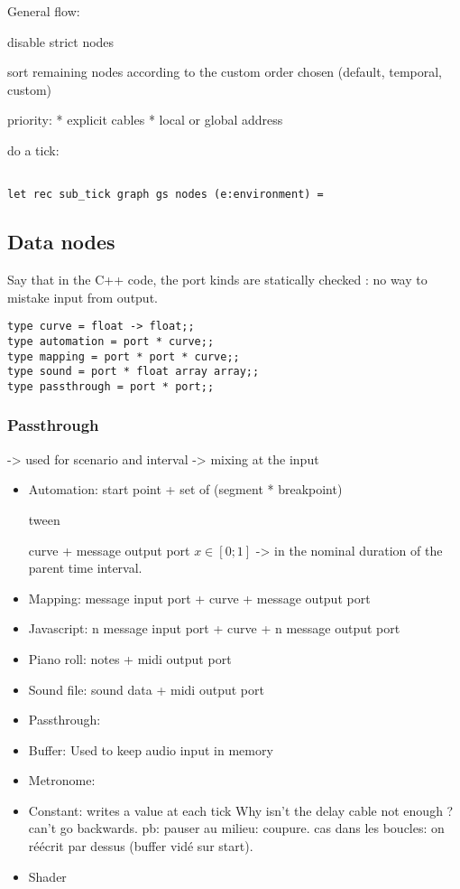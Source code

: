 \documentclass[applsci,article,submit,moreauthors,pdftex,10pt,a4paper]{mdpi}
\begin{document}
General flow: 

disable strict nodes

sort remaining nodes according to the custom order chosen (default, temporal, custom)

priority: 
* explicit cables
* local or global address

do a tick: 

\begin{lstlisting}

let rec sub_tick graph gs nodes (e:environment) =
\end{lstlisting}


\subsection{Data nodes}
Say that in the C++ code, the port kinds are statically checked : no way to mistake input from output.
\begin{lstlisting}
type curve = float -> float;;
type automation = port * curve;;
type mapping = port * port * curve;;
type sound = port * float array array;;
type passthrough = port * port;;
\end{lstlisting}
\subsubsection{Passthrough}
-> used for scenario and interval
-> mixing at the input

\begin{itemize}
\item Automation: 
start point + set of (segment * breakpoint)

tween

curve + message output port
$x\in[0;1]$ -> in the nominal duration of the parent time interval.

\item Mapping: message input port + curve + message output port
\item Javascript:  n message input port + curve + n message output port
\item Piano roll:  notes + midi output port
\item Sound file: sound data + midi output port
\item Passthrough:
\item Buffer: Used to keep audio input in memory
\item Metronome: 
\item Constant: writes a value at each tick
Why isn't the delay cable not enough ? can't go backwards. 
pb: pauser au milieu: coupure. cas dans les boucles: on réécrit par dessus (buffer vidé sur start).
\item Shader
\end{itemize}
\end{document}
